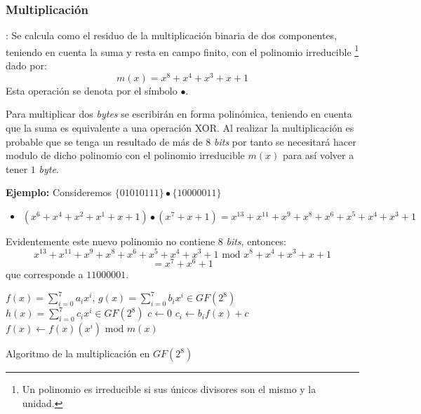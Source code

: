 \documentclass[peerreview]{IEEEtran}
\begin{document}
\subsubsection{Multiplicación}: Se calcula como el residuo de la multiplicación binaria de dos componentes, teniendo en cuenta la suma y resta en campo finito, con el polinomio irreducible \footnote{Un polinomio es irreducible si sus únicos divisores son el mismo y la unidad.} dado por:
    $$m(x)=x^8 + x^4 + x^3 + x +1 $$
    Esta operación se denota por el símbolo $\bullet$.

Para multiplicar dos \textit{bytes} se escribirán en forma polinómica, teniendo en cuenta que la suma es equivalente a una operación XOR. Al realizar la multiplicación es probable que se tenga un resultado de más de $8$ \textit{bits} por tanto se necesitará hacer modulo de dicho polinomio con el polinomio irreducible $m(x)$ para así volver a tener $1$ \textit{byte}. 

\textbf{Ejemplo:} Consideremos $\{01010111\}\bullet\{10000011\}$
\begin{itemize}
    \item $(x^6 +x^4 +x^2 +x^1 + x +1)\bullet(x^7 + x+1)= x^{13} + x^{11} + x^{
    9}+x^{8}+x^{6}+x^5 + x^4 + x^3 +1$
\end{itemize}
Evidentemente este nuevo polinomio no contiene $8$ \textit{bits}, entonces:
$$x^{13} + x^{11} + x^{9}+x^{8}+x^{6}+x^5 + x^4 + x^3 +1 \text{ mod } x^8 + x^4 +x^3 +x +1$$
$$=x^7 + x^6 +1$$ que corresponde a $11000001.$
\begin{algorithm}
\begin{algorithmic}[1]
  \REQUIRE $f(x)=\sum_{i=0}^{7}a_{i}x^{i}$, $g(x)=\sum_{i=0}^{7}b_{i}x^{i} \in GF(2^8)$
  \ENSURE  $h(x)=\sum_{i=0}^{7}c_{i}x^i \in GF(2^8)$
  \STATE $c \leftarrow 0$
  \STATE $c_i  \leftarrow b_i f(x) + c$
  \STATE $f(x) \leftarrow f(x)(x^i) \text{ mod } m(x)$
  \ENDFOR
\end{algorithmic} 
  
  \caption{Algoritmo de la multiplicación en $GF(2^8)$}
  \label{a2}
\end{algorithm}

\end{document}
